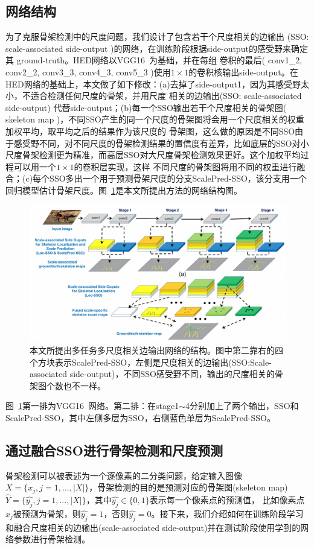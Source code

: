 \documentclass[UTF8]{ctexart}
\numberwithin{equation}{section} %
\numberwithin{table}{section} %
\begin{document}
\subsection{网络结构}
为了克服骨架检测中的尺度问题，我们设计了包含若干个尺度相关的边输出 (SSO: scale-associated side-output )的网络，在训练阶段根据side-output的感受野来确定其 ground-truth。HED网络以VGG16~\cite{Simonyan14c}为基础，并在每组
卷积的最后( conv1\_2, conv2\_2, conv3\_3, conv4\_3, conv5\_3 )使用$1 \times 1$的卷积核输出side-output。在HED网络的基础上，本文做了如下修改：(a)去掉了side-output1，因为其感受野太小，不适合检测任何尺度的骨架，并用尺度
相关的边输出(SSO: scale-associated side-output) 代替side-output；(b)每一个SSO输出若干个尺度相关的骨架图( skeleton map )，不同SSO产生的同一个尺度的骨架图将会用一个尺度相关的权重加权平均，取平均之后的结果作为该尺度的
骨架图，这么做的原因是不同SSO由于感受野不同，对不同尺度的骨架检测结果的置信度有差异，比如底层的SSO对小尺度骨架检测更为精准，而高层SSO对大尺度骨架检测效果更好。这个加权平均过程可以用一个$1 \times 1$的卷积层实现，这样
不同尺度的骨架图将用不同的权重进行融合；(c)每个SSO多出一个用于预测骨架尺度的分支ScalePred-SSO，该分支用一个回归模型估计骨架尺度。图~\ref{fig:lmsds_arch}是本文所提出方法的网络结构图。
\begin{figure}[!htb]
\centering
\includegraphics[scale=0.3]{figures/lmsds_arch.png}
\caption{本文所提出多任务多尺度相关边输出网络的结构。图中第二靠右的四个方块表示ScalePred-SSO，左侧是尺度相关的边输出(SSO:Scale-associated side-output)，不同SSO感受野不同，输出的尺度相关的骨架图个数也不一样。
}
\label{fig:lmsds_arch}
\end{figure}
图~\ref{fig:lmsds_arch}第一排为VGG16~\cite{Simonyan14c}网络。第二排：在stage1$\sim$4分别加上了两个输出，SSO和ScalePred-SSO，其中左侧多层为SSO，右侧蓝色单层为ScalePred-SSO。
\subsection{通过融合SSO进行骨架检测和尺度预测}
骨架检测可以被表述为一个逐像素的二分类问题，给定输入图像$X=\{x_j, j=1,...,|X|\}$，骨架检测的目的是预测对应的骨架图(skeleton map)$\hat{Y}=\{\hat{y_j},j=1,...,|X|\}$，其中$\hat{y_j} \in \{0,1\}$表示每一个像素点的预测值，
比如像素点$x_j$被预测为骨架，则$\hat{y_j} = 1$，否则$\hat{y_j} = 0$。接下来，我们介绍如何在训练阶段学习和融合尺度相关的边输出(scale-associated side-output)并在测试阶段使用学到的网络参数进行骨架检测。
\end{document}
